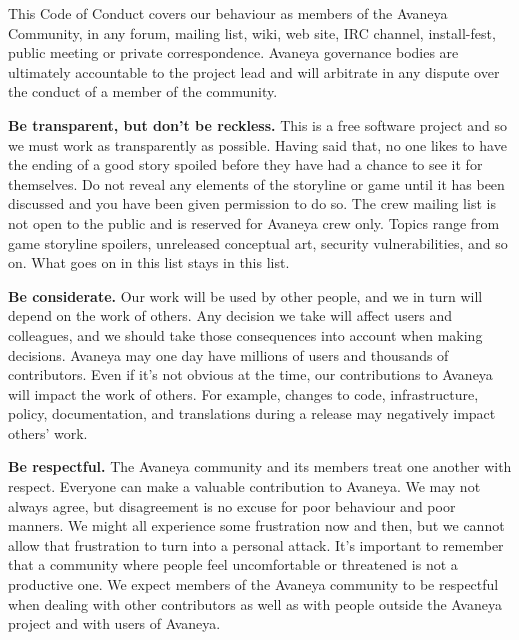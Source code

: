 
\blank
{}
\blank

This Code of Conduct covers our behaviour as members of the Avaneya Community, in any forum, mailing list, wiki, web site, IRC channel, install-fest, public meeting or private correspondence. Avaneya governance bodies are ultimately accountable to the project lead and will arbitrate in any dispute over the conduct of a member of the community.

\startitemize[3]
\item
{\bf Be transparent, but don't be reckless.} This is a free software project and so we must work as transparently as possible. Having said that, no one likes to have the ending of a good story spoiled before they have had a chance to see it for themselves. Do not reveal any elements of the storyline or game until it has been discussed and you have been given permission to do so. The crew mailing list is not open to the public and is reserved for Avaneya crew only. Topics range from game storyline spoilers, unreleased conceptual art, security vulnerabilities, and so on. What goes on in this list stays in this list.

\item
{\bf Be considerate.} Our work will be used by other people, and we in turn will depend on the work of others. Any decision we take will affect users and colleagues, and we should take those consequences into account when making decisions. Avaneya may one day have millions of users and thousands of contributors. Even if it's not obvious at the time, our contributions to Avaneya will impact the work of others. For example, changes to code, infrastructure, policy, documentation, and translations during a release may negatively impact others' work.

\item
{\bf Be respectful.} The Avaneya community and its members treat one another with respect. Everyone can make a valuable contribution to Avaneya. We may not always agree, but disagreement is no excuse for poor behaviour and poor manners. We might all experience some frustration now and then, but we cannot allow that frustration to turn into a personal attack. It's important to remember that a community where people feel uncomfortable or threatened is not a productive one. We expect members of the Avaneya community to be respectful when dealing with other contributors as well as with people outside the Avaneya project and with users of Avaneya.

